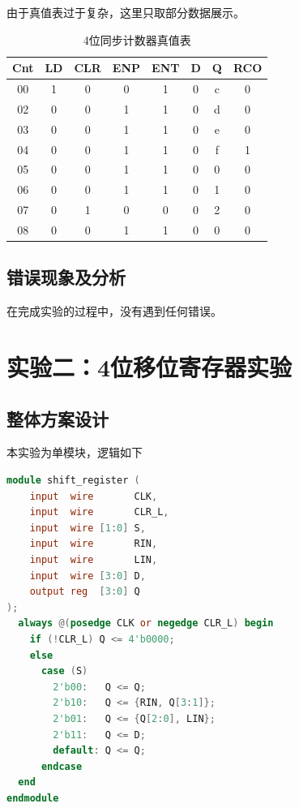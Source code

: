 \documentclass[12pt, a4paper]{ctexart}
\begin{document}
由于真值表过于复杂，这里只取部分数据展示。

\begin{table}[H]
    \centering
    \begin{tabular}{|c|c|c|c|c|c|c|c|}
        \hline
        Cnt & LD & CLR & ENP & ENT & D & Q & RCO \\
        \hline
        00  & 1  & 0   & 0   & 1   & 0 & c & 0 \\
        02  & 0  & 0   & 1   & 1   & 0 & d & 0 \\
        03  & 0  & 0   & 1   & 1   & 0 & e & 0 \\
        04  & 0  & 0   & 1   & 1   & 0 & f & 1 \\
        05  & 0  & 0   & 1   & 1   & 0 & 0 & 0 \\
        06  & 0  & 0   & 1   & 1   & 0 & 1 & 0 \\
        07  & 0  & 1   & 0   & 0   & 0 & 2 & 0 \\
        08  & 0  & 0   & 1   & 1   & 0 & 0 & 0 \\
        \hline
    \end{tabular}
    \caption{4位同步计数器真值表}
\end{table}

\subsection{错误现象及分析}

在完成实验的过程中，没有遇到任何错误。

\section{实验二：4位移位寄存器实验}

\subsection{整体方案设计}

本实验为单模块，逻辑如下

\begin{lstlisting}[language=Verilog, caption={4位移位寄存器模块}]
module shift_register (
    input  wire       CLK,
    input  wire       CLR_L,
    input  wire [1:0] S,
    input  wire       RIN,
    input  wire       LIN,
    input  wire [3:0] D,
    output reg  [3:0] Q
);
  always @(posedge CLK or negedge CLR_L) begin
    if (!CLR_L) Q <= 4'b0000;
    else
      case (S)
        2'b00:   Q <= Q;
        2'b10:   Q <= {RIN, Q[3:1]};
        2'b01:   Q <= {Q[2:0], LIN};
        2'b11:   Q <= D;
        default: Q <= Q;
      endcase
  end
endmodule
\end{lstlisting}
\end{document}
